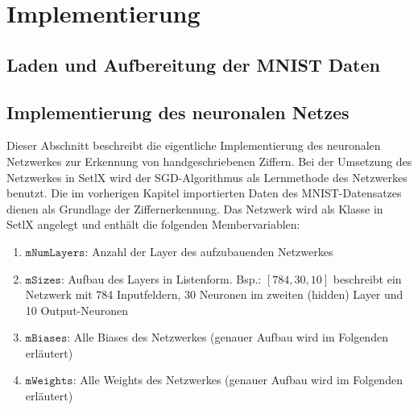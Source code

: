 \chapter{Implementierung}

\section{Laden und Aufbereitung der MNIST Daten}

\section{Implementierung des neuronalen Netzes}
Dieser Abschnitt beschreibt die eigentliche Implementierung des neuronalen Netzwerkes zur Erkennung von handgeschriebenen Ziffern.
Bei der Umsetzung des Netzwerkes in SetlX wird der SGD-Algorithmus als Lernmethode des Netzwerkes benutzt. Die im vorherigen Kapitel importierten Daten des MNIST-Datensatzes dienen als Grundlage der Ziffernerkennung.
Das Netzwerk wird als Klasse in SetlX angelegt und enthält die folgenden Membervariablen:

\begin{enumerate}
\item $\mathtt{mNumLayers}$: Anzahl der Layer des aufzubauenden Netzwerkes 
\item $\mathtt{mSizes}$: Aufbau des Layers in Listenform. Bsp.: $[784, 30, 10]$ beschreibt ein Netzwerk mit 784 Inputfeldern, 30 Neuronen im zweiten (hidden) Layer und 10 Output-Neuronen
\item $\mathtt{mBiases}$: Alle Biases des Netzwerkes (genauer Aufbau wird im Folgenden erläutert)
\item $\mathtt{mWeights}$: Alle Weights des Netzwerkes (genauer Aufbau wird im Folgenden erläutert)
\end{enumerate}

